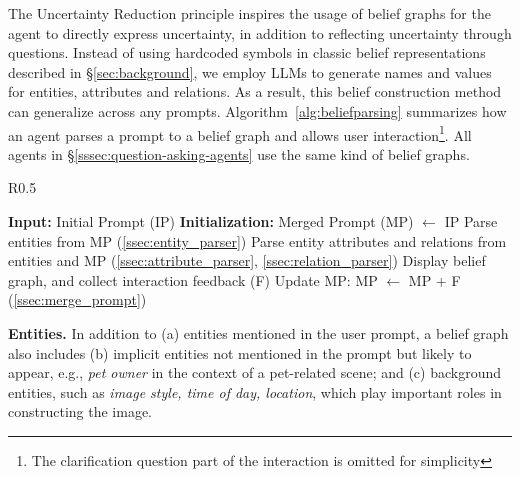 The Uncertainty Reduction principle inspires the usage of belief graphs for the agent to directly express uncertainty, in addition to reflecting uncertainty through questions. %
Instead of using hardcoded symbols in classic belief representations~\citep{fikes1971strips} described in \S\ref{sec:background}, we employ LLMs to generate names and values for entities, attributes and relations. As a result, this belief construction method can generalize across any prompts. %
Algorithm~\ref{alg:beliefparsing} summarizes how an agent parses a prompt to a belief graph and allows user interaction\footnote{The clarification question part of the interaction is omitted for simplicity}. All agents in  \S\ref{sssec:question-asking-agents} use the same kind of belief graphs.

\begin{wrapfigure}{R}{0.5\textwidth} 
    \begin{minipage}{0.5\textwidth}
    \vspace{-2em}
      \begin{algorithm}[H]
        \caption{Belief Parsing and interaction}
        \begin{algorithmic}[1]
         \STATE \textbf{Input:} Initial Prompt (IP) 
          \STATE \textbf{Initialization:} Merged Prompt (MP) $\leftarrow$ IP
             \STATE Parse entities from MP (\ref{ssec:entity_parser})
             \STATE Parse entity attributes and relations from entities and MP (\ref{ssec:attribute_parser}, \ref{ssec:relation_parser})
             \STATE Display belief graph, and collect interaction feedback (F)
             \STATE Update MP: MP $\leftarrow$ MP + F (\ref{ssec:merge_prompt}) 
          \ENDFOR
        \end{algorithmic}
        \label{alg:beliefparsing}
      \end{algorithm}
      \vspace{-2em}
    \end{minipage}
  \end{wrapfigure}
  
  


\textbf{Entities.\;} In addition to (a) entities mentioned in the user prompt, a belief graph also includes (b) implicit entities not mentioned in the prompt but likely to appear, e.g., \textit{pet owner} in the context of a pet-related scene; and (c) background entities, such as \textit{image style, time of day, location}, which play important roles in constructing the image.


